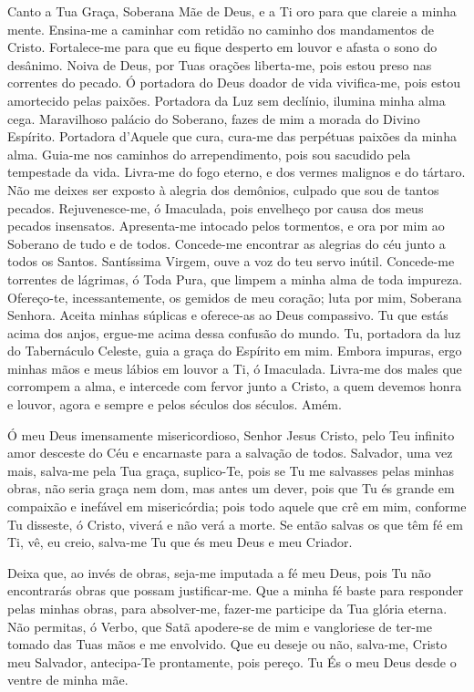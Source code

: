 \documentclass{subfiles}
\begin{document}

Canto a Tua Graça, Soberana Mãe de Deus, e a Ti oro para que clareie
a minha mente. Ensina-me a caminhar com retidão no caminho dos
mandamentos de Cristo. Fortalece-me para que eu fique desperto em louvor
e afasta o sono do desânimo. Noiva de Deus, por Tuas orações liberta-me, pois
estou preso nas correntes do pecado. Ó portadora do Deus doador de vida
vivifica-me, pois estou amortecido pelas paixões. Portadora da Luz sem
declínio, ilumina minha alma cega. Maravilhoso palácio do Soberano, fazes de
mim a morada do Divino Espírito. Portadora d’Aquele que cura, cura-me das
perpétuas paixões da minha alma. Guia-me nos caminhos do arrependimento,
pois sou sacudido pela tempestade da vida. Livra-me do fogo eterno, e dos
vermes malignos e do tártaro. Não me deixes ser exposto à alegria dos
demônios, culpado que sou de tantos pecados. Rejuvenesce-me, ó Imaculada,
pois envelheço por causa dos meus pecados insensatos. Apresenta-me
intocado pelos tormentos, e ora por mim ao Soberano de tudo e de todos.
Concede-me encontrar as alegrias do céu junto a todos os Santos. Santíssima
Virgem, ouve a voz do teu servo inútil. Concede-me torrentes de lágrimas, ó
Toda Pura, que limpem a minha alma de toda impureza. Ofereço-te,
incessantemente, os gemidos de meu coração; luta por mim, Soberana
Senhora. Aceita minhas súplicas e oferece-as ao Deus compassivo. Tu que
estás acima dos anjos, ergue-me acima dessa confusão do mundo. Tu,
portadora da luz do Tabernáculo Celeste, guia a graça do Espírito em mim.
Embora impuras, ergo minhas mãos e meus lábios em louvor a Ti, ó Imaculada.
Livra-me dos males que corrompem a alma, e intercede com fervor junto a
Cristo, a quem devemos honra e louvor, agora e sempre e pelos séculos dos
séculos. Amém.


Ó meu Deus imensamente misericordioso, Senhor Jesus Cristo, pelo Teu infinito
amor desceste do Céu e encarnaste para a salvação de todos. Salvador, uma vez
mais, salva-me pela Tua graça, suplico-Te, pois se Tu me salvasses pelas minhas
obras, não seria graça nem dom, mas antes um dever, pois que Tu és grande em
compaixão e inefável em misericórdia; pois todo aquele que crê em mim, conforme
Tu disseste, ó Cristo, viverá e não verá a morte. Se então salvas os que têm fé
em Ti, vê, eu creio, salva-me Tu que és meu Deus e meu Criador.

Deixa que, ao invés de obras, seja-me imputada a fé meu Deus, pois Tu não
encontrarás obras que possam justificar-me. Que a minha fé baste para responder
pelas minhas obras, para absolver-me, fazer-me participe da Tua glória eterna.
Não permitas, ó Verbo, que Satã apodere-se de mim e vangloriese de ter-me tomado
das Tuas mãos e me envolvido. Que eu deseje ou não, salva-me, Cristo meu
Salvador, antecipa-Te prontamente, pois pereço. Tu És o meu Deus desde o ventre
de minha mãe.
\end{document}
